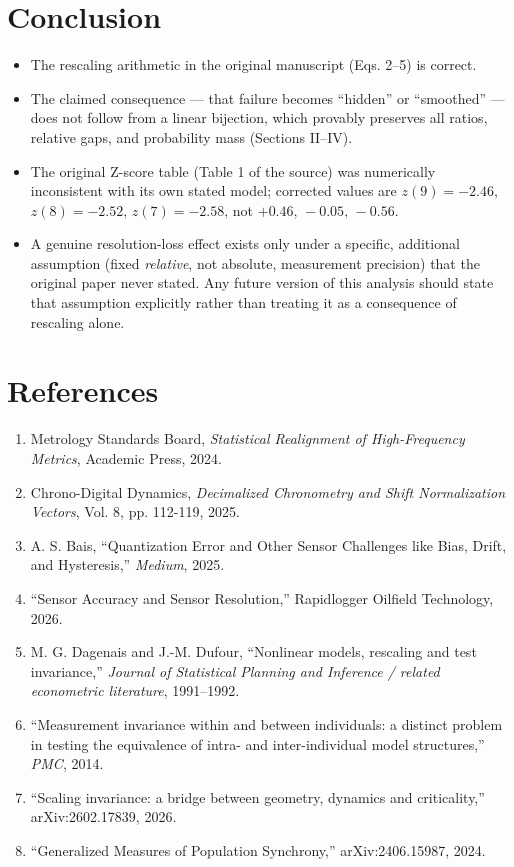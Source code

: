\documentclass[10pt,journal,compsoc]{IEEEtran}
\begin{document}
\section{Conclusion}
\begin{itemize}
    \item The rescaling arithmetic in the original manuscript (Eqs. 2–5) is correct.
    \item The claimed consequence — that failure becomes ``hidden'' or ``smoothed'' — does not follow from a linear bijection, which provably preserves all ratios, relative gaps, and probability mass (Sections II–IV).
    \item The original Z-score table (Table 1 of the source) was numerically inconsistent with its own stated model; corrected values are $z(9)=-2.46$, $z(8)=-2.52$, $z(7)=-2.58$, not $+0.46,\,-0.05,\,-0.56$.
    \item A genuine resolution-loss effect exists only under a specific, additional assumption (fixed \emph{relative}, not absolute, measurement precision) that the original paper never stated. Any future version of this analysis should state that assumption explicitly rather than treating it as a consequence of rescaling alone.
\end{itemize}

\section*{References}
\begin{small}
\begin{enumerate}
    \item Metrology Standards Board, \textit{Statistical Realignment of High-Frequency Metrics}, Academic Press, 2024.
    \item Chrono-Digital Dynamics, \textit{Decimalized Chronometry and Shift Normalization Vectors}, Vol. 8, pp. 112-119, 2025.
    \item A. S. Bais, ``Quantization Error and Other Sensor Challenges like Bias, Drift, and Hysteresis,'' \textit{Medium}, 2025.
    \item ``Sensor Accuracy and Sensor Resolution,'' Rapidlogger Oilfield Technology, 2026.
    \item M. G. Dagenais and J.-M. Dufour, ``Nonlinear models, rescaling and test invariance,'' \textit{Journal of Statistical Planning and Inference / related econometric literature}, 1991--1992.
    \item ``Measurement invariance within and between individuals: a distinct problem in testing the equivalence of intra- and inter-individual model structures,'' \textit{PMC}, 2014.
    \item ``Scaling invariance: a bridge between geometry, dynamics and criticality,'' arXiv:2602.17839, 2026.
    \item ``Generalized Measures of Population Synchrony,'' arXiv:2406.15987, 2024.
\end{enumerate}
\end{small}
\end{document}

